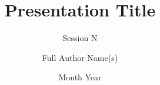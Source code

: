 \documentclass{beamer}
\title{Presentation Title}
\subtitle{Session N}
\author[Short Name]{Full Author Name(s)}
\institute[Short Institute]{
  Full Institute Name
}
\date{Month Year}
\begin{document}
\frame{\titlepage}

\end{document}
